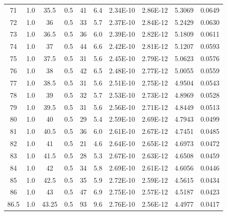 \begin{maintable}[ht]
\begin{tabular}{cccccccccc}
71        & 1.0 & 35.5     & 0.5         & 41    & 6.4      & 2.34E-10      & 2.86E-12         & 5.3069       & 0.0649 \\
72        & 1.0 & 36       & 0.5         & 33    & 5.7      & 2.37E-10      & 2.84E-12         & 5.2429       & 0.0630 \\
73        & 1.0 & 36.5     & 0.5         & 36    & 6.0      & 2.39E-10      & 2.82E-12         & 5.1809       & 0.0611 \\
74        & 1.0 & 37       & 0.5         & 44    & 6.6      & 2.42E-10      & 2.81E-12         & 5.1207       & 0.0593 \\
75        & 1.0 & 37.5     & 0.5         & 31    & 5.6      & 2.45E-10      & 2.79E-12         & 5.0623       & 0.0576 \\
76        & 1.0 & 38       & 0.5         & 42    & 6.5      & 2.48E-10      & 2.77E-12         & 5.0055       & 0.0559 \\
77        & 1.0 & 38.5     & 0.5         & 31    & 5.6      & 2.51E-10      & 2.75E-12         & 4.9504       & 0.0543 \\
78        & 1.0 & 39       & 0.5         & 32    & 5.7      & 2.53E-10      & 2.73E-12         & 4.8969       & 0.0528 \\
79        & 1.0 & 39.5     & 0.5         & 31    & 5.6      & 2.56E-10      & 2.71E-12         & 4.8449       & 0.0513 \\
80        & 1.0 & 40       & 0.5         & 29    & 5.4      & 2.59E-10      & 2.69E-12         & 4.7943       & 0.0499 \\
81        & 1.0 & 40.5     & 0.5         & 36    & 6.0      & 2.61E-10      & 2.67E-12         & 4.7451       & 0.0485 \\
82        & 1.0 & 41       & 0.5         & 21    & 4.6      & 2.64E-10      & 2.65E-12         & 4.6973       & 0.0472 \\
83        & 1.0 & 41.5     & 0.5         & 28    & 5.3      & 2.67E-10      & 2.63E-12         & 4.6508       & 0.0459 \\
84        & 1.0 & 42       & 0.5         & 34    & 5.8      & 2.69E-10      & 2.61E-12         & 4.6056       & 0.0446 \\
85        & 1.0 & 42.5     & 0.5         & 35    & 5.9      & 2.72E-10      & 2.59E-12         & 4.5615       & 0.0434 \\
86        & 1.0 & 43       & 0.5         & 47    & 6.9      & 2.75E-10      & 2.57E-12         & 4.5187       & 0.0423 \\
86.5        & 1.0 & 43.25    & 0.5         & 93    & 9.6      & 2.76E-10      & 2.56E-12         & 4.4977       & 0.0417 \\

\end{tabular}
\end{maintable}
